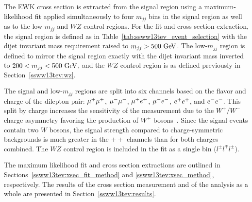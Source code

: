
The \ssww EWK cross section is extracted from the signal region using a maximum-likelihood fit applied simultaneously to four $m_{jj}$ bins in the signal region as well as to the low-$m_{jj}$ and $WZ$ control regions.
For the fit and cross section extraction, the signal region is defined as in Table~\ref{tab:ssww13tev_event_selection} with the dijet invariant mass requirement raised to $m_{jj} > 500\gev$.
The low-$m_{jj}$ region is defined to mirror the signal region exactly with the dijet invariant mass inverted to $200 < m_{jj} < 500\gev$, and the $WZ$ control region is as defined previously in Section~\ref{ssww13tev:wz}.

The signal and low-$m_{jj}$ regions are split into six channels based on the flavor and charge of the dilepton pair: $\mu^{+}\mu^{+}$, $\mu^{-}\mu^{-}$, $\mu^{+}e^{+}$, $\mu^{-}e^{-}$, $e^{+}e^{+}$, and $e^{-}e^{-}$.
This split by charge increases the sensitivity of the measurement due to the $W^{+}/W^{-}$ charge asymmetry favoring the production of $W^{+}$ bosons~\cite{2010.w-charge-asymmetry}.
Since the signal events contain two $W$ bosons, the signal strength compared to charge-symmetric backgrounds is much greater in the $++$ channels than for both charges combined.
The $WZ$ control region is included in the fit as a single bin ($l^{\pm}l^{\mp}l^{\pm}$).

The maximum likelihood fit and cross section extractions are outlined in Sections~\ref{ssww13tev:xsec_fit_method} and \ref{ssww13tev:xsec_method}, respectively.
The results of the cross section measurement and of the analysis as a whole are presented in Section~\ref{ssww13tev:results}.

